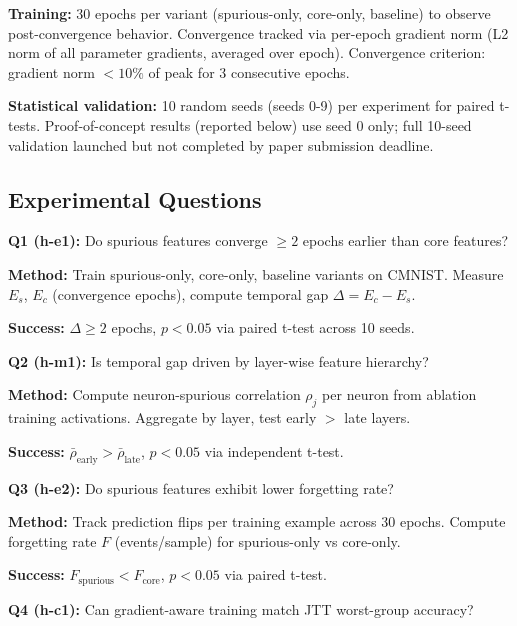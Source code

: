 \textbf{Training:} 30 epochs per variant (spurious-only, core-only, baseline) to observe post-convergence behavior. Convergence tracked via per-epoch gradient norm (L2 norm of all parameter gradients, averaged over epoch). Convergence criterion: gradient norm $< 10\%$ of peak for 3 consecutive epochs.

\textbf{Statistical validation:} 10 random seeds (seeds 0-9) per experiment for paired t-tests. Proof-of-concept results (reported below) use seed 0 only; full 10-seed validation launched but not completed by paper submission deadline.

\subsection{Experimental Questions}

\textbf{Q1 (h-e1):} Do spurious features converge $\geq 2$ epochs earlier than core features?

\textbf{Method:} Train spurious-only, core-only, baseline variants on CMNIST. Measure $E_s$, $E_c$ (convergence epochs), compute temporal gap $\Delta = E_c - E_s$.

\textbf{Success:} $\Delta \geq 2$ epochs, $p < 0.05$ via paired t-test across 10 seeds.

\vspace{0.5em}

\textbf{Q2 (h-m1):} Is temporal gap driven by layer-wise feature hierarchy?

\textbf{Method:} Compute neuron-spurious correlation $\rho_j$ per neuron from ablation training activations. Aggregate by layer, test early $>$ late layers.

\textbf{Success:} $\bar{\rho}_{\text{early}} > \bar{\rho}_{\text{late}}$, $p < 0.05$ via independent t-test.

\vspace{0.5em}

\textbf{Q3 (h-e2):} Do spurious features exhibit lower forgetting rate?

\textbf{Method:} Track prediction flips per training example across 30 epochs. Compute forgetting rate $F$ (events/sample) for spurious-only vs core-only.

\textbf{Success:} $F_{\text{spurious}} < F_{\text{core}}$, $p < 0.05$ via paired t-test.

\vspace{0.5em}

\textbf{Q4 (h-c1):} Can gradient-aware training match JTT worst-group accuracy?

